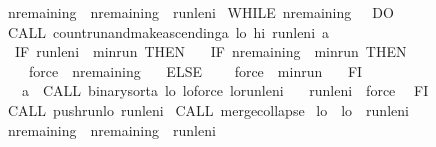 \begin{isabellebody}
\ {\isasymacute}n{\isacharunderscore}remaining\ {\isacharcolon}{\isacharequal}{\isacharequal}\ {\isasymacute}n{\isacharunderscore}remaining\ {\isacharminus}\ {\isasymacute}run{\isacharunderscore}len{\isacharunderscore}i{\isacharsemicolon}{\isacharsemicolon}\isanewline
\ WHILE\ {\isasymacute}n{\isacharunderscore}remaining\ {\isasymnoteq}\ {}\ DO\ \isanewline
\ CALL\ count{\isacharunderscore}run{\isacharunderscore}and{\isacharunderscore}make{\isacharunderscore}ascending{\isacharparenleft}{\isasymacute}a{\isacharcomma}\ {\isasymacute}lo{\isacharcomma}\ {\isasymacute}hi\ {\isacharcomma}{\isasymacute}run{\isacharunderscore}len{\isacharunderscore}i{\isacharcomma}\ {\isasymacute}a{\isacharparenright}{\isacharsemicolon}{\isacharsemicolon}\isanewline
\ \ IF\ {\isasymacute}run{\isacharunderscore}len{\isacharunderscore}i\ {\isacharless}\ {\isasymacute}min{\isacharunderscore}run\ THEN\isanewline
\ \ \ IF\ {\isasymacute}n{\isacharunderscore}remaining\ {\isasymle}\ {\isasymacute}min{\isacharunderscore}run\ THEN\isanewline
\ \ \ \ {\isasymacute}force\ {\isacharcolon}{\isacharequal}{\isacharequal}\ {\isasymacute}n{\isacharunderscore}remaining\isanewline
\ \ \ ELSE\isanewline
\ \ \ \ {\isasymacute}force\ {\isacharcolon}{\isacharequal}{\isacharequal}\ {\isasymacute}min{\isacharunderscore}run\isanewline
\ \ \ FI{\isacharsemicolon}{\isacharsemicolon}\isanewline
\ \ \ {\isasymacute}a\ {\isacharcolon}{\isacharequal}{\isacharequal}\ CALL\ binary{\isacharunderscore}sort{\isacharparenleft}{\isasymacute}a{\isacharcomma}\ {\isasymacute}lo{\isacharcomma}\ {\isasymacute}lo{\isacharplus}{\isasymacute}force{\isacharcomma}\ {\isasymacute}lo{\isacharplus}{\isasymacute}run{\isacharunderscore}len{\isacharunderscore}i{\isacharparenright}{\isacharsemicolon}{\isacharsemicolon}\isanewline
\ \ \ {\isasymacute}run{\isacharunderscore}len{\isacharunderscore}i\ {\isacharcolon}{\isacharequal}{\isacharequal}\ {\isasymacute}force\isanewline
\ \ FI{\isacharsemicolon}{\isacharsemicolon}\isanewline
\ CALL\ push{\isacharunderscore}run{\isacharparenleft}{\isasymacute}lo{\isacharcomma}\ {\isasymacute}run{\isacharunderscore}len{\isacharunderscore}i{\isacharparenright}{\isacharsemicolon}{\isacharsemicolon}\isanewline
\ CALL\ merge{\isacharunderscore}collapse{\isacharparenleft}{\isacharparenright}{\isacharsemicolon}{\isacharsemicolon}\isanewline
\ {\isasymacute}lo\ {\isacharcolon}{\isacharequal}{\isacharequal}\ {\isasymacute}lo\ {\isacharplus}\ {\isasymacute}run{\isacharunderscore}len{\isacharunderscore}i{\isacharsemicolon}{\isacharsemicolon}\isanewline
\ {\isasymacute}n{\isacharunderscore}remaining\ {\isacharcolon}{\isacharequal}{\isacharequal}\ {\isasymacute}n{\isacharunderscore}remaining\ {\isacharminus}\ {\isasymacute}run{\isacharunderscore}len{\isacharunderscore}i\isanewline

\end{isabellebody}
